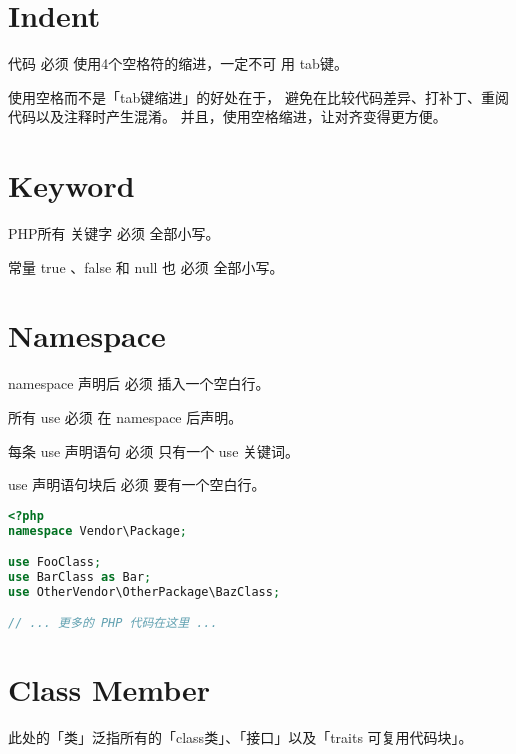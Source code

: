 \section{Indent}

代码 必须 使用4个空格符的缩进，一定不可 用 tab键。

使用空格而不是「tab键缩进」的好处在于， 避免在比较代码差异、打补丁、重阅代码以及注释时产生混淆。 并且，使用空格缩进，让对齐变得更方便。

\section{Keyword}

\begin{compactitem}
\item PHP所有 关键字 必须 全部小写。
\item 常量 true 、false 和 null 也 必须 全部小写。
\end{compactitem}


\section{Namespace}

\begin{compactitem}
\item namespace 声明后 必须 插入一个空白行。

\item 所有 use 必须 在 namespace 后声明。

\item 每条 use 声明语句 必须 只有一个 use 关键词。

\item use 声明语句块后 必须 要有一个空白行。

\end{compactitem}


\begin{lstlisting}[language=PHP]
<?php
namespace Vendor\Package;

use FooClass;
use BarClass as Bar;
use OtherVendor\OtherPackage\BazClass;

// ... 更多的 PHP 代码在这里 ...
\end{lstlisting}

\section{Class Member}

此处的「类」泛指所有的「class类」、「接口」以及「traits 可复用代码块」。

